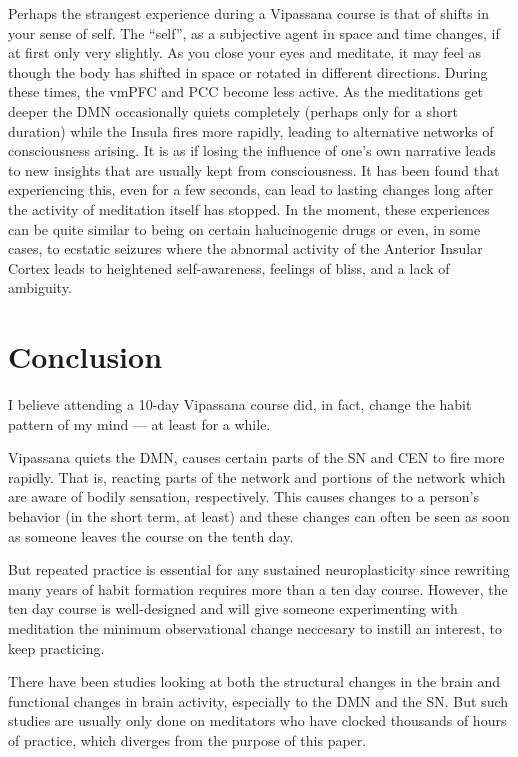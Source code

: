\documentclass[a4paper, amsfonts, amssymb, amsmath, reprint, showkeys, nofootinbib, twoside]{revtex4-1}
\begin{document}
Perhaps the strangest experience during a Vipassana course is that of shifts in your
sense of self. The ``self'', as a subjective agent in space and time changes, if at
first only very slightly. As you close your eyes and meditate, it may feel as though
the body has shifted in space or rotated in different directions. During these times,
the vmPFC and PCC become less active. As the meditations get deeper the DMN
occasionally quiets completely (perhaps only for a short duration) while the Insula
fires more rapidly, leading to alternative networks of consciousness arising. It is
as if losing the influence of one's own narrative leads to new insights that are
usually kept from consciousness. It has been found that experiencing this, even for a
few seconds, can lead to lasting changes long after the activity of meditation itself
has stopped. \cite{alteredtraits} In the moment, these experiences can be quite
similar to being on certain halucinogenic drugs or even, in some cases, to ecstatic
seizures where the abnormal activity of the Anterior Insular Cortex leads to
heightened self-awareness, feelings of bliss, and a lack of ambiguity. \cite{cortexbliss}

\section{Conclusion}

I believe attending a 10-day Vipassana course did, in fact, change the habit pattern
of my mind --- at least for a while.

Vipassana quiets the DMN, causes certain parts of the SN and CEN to fire more
rapidly. That is, reacting parts of the network and portions of the network which are
aware of bodily sensation, respectively. This causes changes to a person's behavior
(in the short term, at least) and these changes can often be seen as soon as someone
leaves the course on the tenth day.

But repeated practice is essential for any sustained neuroplasticity since rewriting
many years of habit formation requires more than a ten day course. However, the ten
day course is well-designed and will give someone experimenting with meditation the
minimum observational change neccesary to instill an interest, to keep practicing.

There have been studies looking at both the structural changes in the brain and
functional changes in brain activity, especially to the DMN and the SN. But such
studies are usually only done on meditators who have clocked thousands of hours of
practice, which diverges from the purpose of this paper. 
\end{document}
